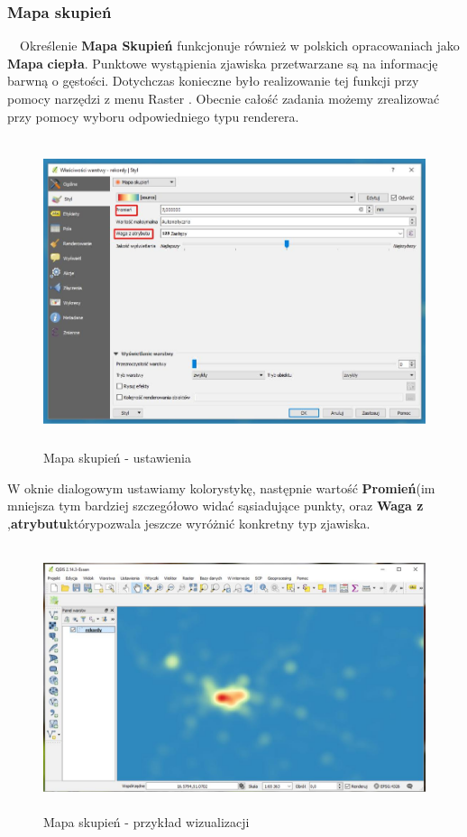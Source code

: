 \documentclass[12pt,a4paper]{book}
\begin{document}
\subsubsection{Mapa skupień}
\ \ Określenie \textbf{Mapa Skupień} funkcjonuje również w polskich opracowaniach jako \textbf{Mapa} \textbf{ciepła}. Punktowe wystąpienia zjawiska przetwarzane są na informację barwną o gęstości. Dotychczas konieczne było realizowanie tej funkcji przy pomocy narzędzi z menu  Raster . Obecnie całość zadania możemy zrealizować przy pomocy wyboru odpowiedniego typu renderera.


\begin{center}
\begin{figure}
\includegraphics[width=13cm,height=9.006cm]{007-heatmap-u.jpg}
\caption{Mapa skupień - ustawienia}
\end{figure}
\end{center}
W oknie dialogowym ustawiamy kolorystykę, następnie wartość \textbf{Promień}(im mniejsza tym bardziej szczegółowo widać sąsiadujące punkty, oraz \textbf{Waga z} ,\textbf{atrybutu}którypozwala jeszcze wyróżnić konkretny typ zjawiska.


\begin{center}
\begin{figure}
\includegraphics[width=13cm,height=7.747cm]{007-heatmap-w.jpg}
\caption{Mapa skupień - przykład wizualizacji}
\end{figure}
\end{center}
\end{document}
